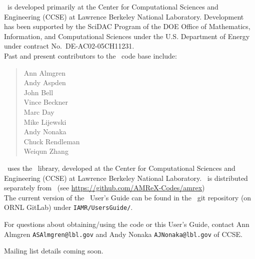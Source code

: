 \noindent \iamr\ is developed primarily at the Center for Computational Sciences and
Engineering (CCSE) at Lawrence Berkeley National Laboratory.  Development has been supported
by the SciDAC Program of the DOE Office of Mathematics, Information, and Computational Sciences
under the U.S. Department of Energy under contract No.\ DE-AC02-05CH11231. \\

Past and present contributors to the \iamr\ code base include: %
\begin{quote}
Ann Almgren\\
Andy Aspden\\
John Bell\\
Vince Beckner\\
Marc Day\\
Mike Lijewski\\
Andy Nonaka\\
Chuck Rendleman\\
Weiqun Zhang\\
\end{quote}

\noindent \iamr\ uses the \amrex\ library,
developed at the Center for Computational Sciences and Engineering (CCSE)
at Lawrence Berkeley National Laboratory.  \amrex\ is distributed
separately from \iamr\ (see \url{https://github.com/AMReX-Codes/amrex})
\\

\noindent The current version of the \iamr\ User's Guide can be found in 
the \iamr\ git repository (on ORNL GitLab)
under {\tt IAMR/UsersGuide/}.

\noindent For questions about obtaining/using the code or this 
User's Guide, contact Ann Almgren {\tt ASAlmgren@lbl.gov} and Andy Nonaka 
{\tt AJNonaka@lbl.gov} of CCSE.

\noindent Mailing list details coming soon.
